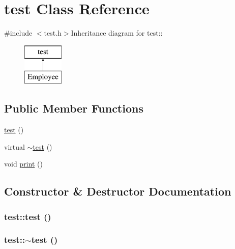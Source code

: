 \hypertarget{classtest}{
\section{test Class Reference}
\label{classtest}
}


{\ttfamily \#include $<$test.h$>$}Inheritance diagram for test::\begin{figure}[H]
\begin{center}
\leavevmode
\includegraphics[height=2cm]{classtest}
\end{center}
\end{figure}
\subsection*{Public Member Functions}
\begin{DoxyCompactItemize}
\item 
\hyperlink{classtest_ab42d5ece712d716b04cb3f686f297a26}{test} ()
\item 
virtual \hyperlink{classtest_ad117cf4e90c87c17bb9b030d23810ec8}{$\sim$test} ()
\item 
void \hyperlink{classtest_a861706972dfd4e400a59f3d13e4f3710}{print} ()
\end{DoxyCompactItemize}


\subsection{Constructor \& Destructor Documentation}
\hypertarget{classtest_ab42d5ece712d716b04cb3f686f297a26}{
\subsubsection[{test}]{\setlength{\rightskip}{0pt plus 5cm}test::test ()}}
\label{classtest_ab42d5ece712d716b04cb3f686f297a26}
\hypertarget{classtest_ad117cf4e90c87c17bb9b030d23810ec8}{
\subsubsection[{$\sim$test}]{\setlength{\rightskip}{0pt plus 5cm}test::$\sim$test ()}}
\label{classtest_ad117cf4e90c87c17bb9b030d23810ec8}


